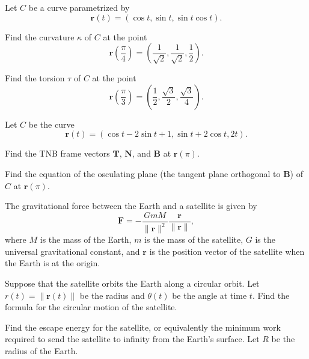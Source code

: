 \begin{problem}
Let $C$ be a curve parametrized by
\[
\mathbf r(t)=(\cos t, \sin t, \sin t\cos t).
\]
\begin{problemsubparts}
\item Find the curvature $\kappa$ of $C$ at the point
\[
\mathbf r\!\left(\frac{\pi}{4}\right)
=\left(\frac{1}{\sqrt2}, \frac{1}{\sqrt2}, \frac12\right).
\]
\item Find the torsion $\tau$ of $C$ at the point
\[
\mathbf r\!\left(\frac{\pi}{3}\right)
=\left(\frac12, \frac{\sqrt3}{2}, \frac{\sqrt3}{4}\right).
\]
\end{problemsubparts}
\end{problem}

\begin{problem}
Let $C$ be the curve
\[
\mathbf r(t)
=(\cos t-2\sin t+1, \sin t+2\cos t, 2t).
\]
\begin{problemsubparts}
\item Find the TNB frame vectors $\mathbf T$, $\mathbf N$, and $\mathbf B$ at $\mathbf r(\pi)$.
\item Find the equation of the osculating plane (the tangent plane orthogonal to $\mathbf B$) of $C$ at $\mathbf r(\pi)$.
\end{problemsubparts}
\end{problem}

\begin{problem}
The gravitational force between the Earth and a satellite is given by
\[
\mathbf F
=-\frac{GmM}{\|\mathbf r\|^2}\frac{\mathbf r}{\|\mathbf r\|},
\]
where $M$ is the mass of the Earth, $m$ is the mass of the satellite, $G$ is the universal gravitational constant, and $\mathbf r$ is the position vector of the satellite when the Earth is at the origin.
\begin{problemsubparts}
\item Suppose that the satellite orbits the Earth along a circular orbit. Let $r(t)=\|\mathbf r(t)\|$ be the radius and $\theta(t)$ be the angle at time $t$. Find the formula for the circular motion of the satellite.
\item Find the escape energy for the satellite, or equivalently the minimum work required to send the satellite to infinity from the Earth's surface. Let $R$ be the radius of the Earth.
\end{problemsubparts}
\end{problem}

